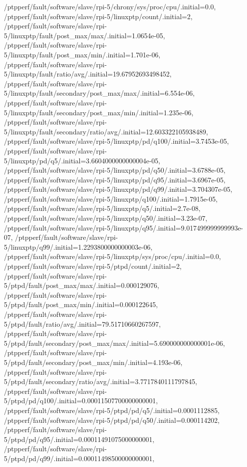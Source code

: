 {    /ptpperf/fault/software/slave/rpi-5/chrony/sys/proc/cpu/.initial=0.0,
    /ptpperf/fault/software/slave/rpi-5/linuxptp/count/.initial=2,
    /ptpperf/fault/software/slave/rpi-5/linuxptp/fault/post_max/max/.initial=1.0654e-05,
    /ptpperf/fault/software/slave/rpi-5/linuxptp/fault/post_max/min/.initial=1.701e-06,
    /ptpperf/fault/software/slave/rpi-5/linuxptp/fault/ratio/avg/.initial=19.67952693498452,
    /ptpperf/fault/software/slave/rpi-5/linuxptp/fault/secondary/post_max/max/.initial=6.554e-06,
    /ptpperf/fault/software/slave/rpi-5/linuxptp/fault/secondary/post_max/min/.initial=1.235e-06,
    /ptpperf/fault/software/slave/rpi-5/linuxptp/fault/secondary/ratio/avg/.initial=12.603322105938489,
    /ptpperf/fault/software/slave/rpi-5/linuxptp/pd/q100/.initial=3.7453e-05,
    /ptpperf/fault/software/slave/rpi-5/linuxptp/pd/q5/.initial=3.6604000000000004e-05,
    /ptpperf/fault/software/slave/rpi-5/linuxptp/pd/q50/.initial=3.6788e-05,
    /ptpperf/fault/software/slave/rpi-5/linuxptp/pd/q95/.initial=3.6967e-05,
    /ptpperf/fault/software/slave/rpi-5/linuxptp/pd/q99/.initial=3.704307e-05,
    /ptpperf/fault/software/slave/rpi-5/linuxptp/q100/.initial=1.7915e-05,
    /ptpperf/fault/software/slave/rpi-5/linuxptp/q5/.initial=2.7e-08,
    /ptpperf/fault/software/slave/rpi-5/linuxptp/q50/.initial=3.23e-07,
    /ptpperf/fault/software/slave/rpi-5/linuxptp/q95/.initial=9.017499999999993e-07,
    /ptpperf/fault/software/slave/rpi-5/linuxptp/q99/.initial=1.2293800000000003e-06,
    /ptpperf/fault/software/slave/rpi-5/linuxptp/sys/proc/cpu/.initial=0.0,
    /ptpperf/fault/software/slave/rpi-5/ptpd/count/.initial=2,
    /ptpperf/fault/software/slave/rpi-5/ptpd/fault/post_max/max/.initial=0.000129076,
    /ptpperf/fault/software/slave/rpi-5/ptpd/fault/post_max/min/.initial=0.000122645,
    /ptpperf/fault/software/slave/rpi-5/ptpd/fault/ratio/avg/.initial=79.51710660267597,
    /ptpperf/fault/software/slave/rpi-5/ptpd/fault/secondary/post_max/max/.initial=5.690000000000001e-06,
    /ptpperf/fault/software/slave/rpi-5/ptpd/fault/secondary/post_max/min/.initial=4.193e-06,
    /ptpperf/fault/software/slave/rpi-5/ptpd/fault/secondary/ratio/avg/.initial=3.7717840111797845,
    /ptpperf/fault/software/slave/rpi-5/ptpd/pd/q100/.initial=0.00011507700000000001,
    /ptpperf/fault/software/slave/rpi-5/ptpd/pd/q5/.initial=0.0001112885,
    /ptpperf/fault/software/slave/rpi-5/ptpd/pd/q50/.initial=0.000114202,
    /ptpperf/fault/software/slave/rpi-5/ptpd/pd/q95/.initial=0.00011491075000000001,
    /ptpperf/fault/software/slave/rpi-5/ptpd/pd/q99/.initial=0.00011498500000000001,
}
